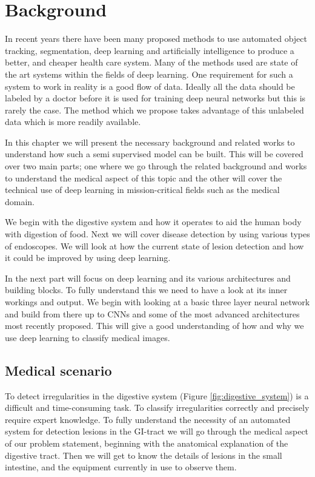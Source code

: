 \documentclass[thesis.tex]{subfiles}
\begin{document}
\chapter{Background} \label{chap:background}
In recent years there have been many proposed methods to use automated object tracking, segmentation, deep learning and artificially intelligence to produce a better, and cheaper health care system. Many of the methods used are state of the art systems within the fields of deep learning. One requirement for such a system to work in reality is a good flow of data. Ideally all the data should be labeled by a doctor before it is used for training deep neural networks but this is rarely the case. The method which we propose takes advantage of this unlabeled data which is more readily available.

In this chapter we will present the necessary background and related works to understand how such a semi supervised model can be built. This will be covered over two main parts; one where we go through the related background and works to understand the medical aspect of this topic and the other will cover the technical use of deep learning in mission-critical fields such as the medical domain.

We begin with the digestive system and how it operates to aid the human body with digestion of food. Next we will cover disease detection by using various types of endoscopes. We will look at how the current state of lesion detection and how it could be improved by using deep learning. 

In the next part will focus on deep learning and its various architectures and building blocks. To fully understand this we need to have a look at its inner workings and output. We begin with looking at a basic three layer neural network and build from there up to CNNs and some of the most advanced architectures most recently proposed. This will give a good understanding of how and why we use deep learning to classify medical images.


\section{Medical scenario} \label{sec:medical_scenario}
To detect irregularities in the digestive system (Figure \ref{fig:digestive_system}) is a difficult and time-consuming task. To classify irregularities correctly and precisely require expert knowledge. To fully understand the necessity of an automated system for detection lesions in the GI-tract we will go through the medical aspect of our problem statement, beginning with the anatomical explanation of the digestive tract. Then we will get to know the details of lesions in the small intestine, and the equipment currently in use to observe them.
\end{document}
